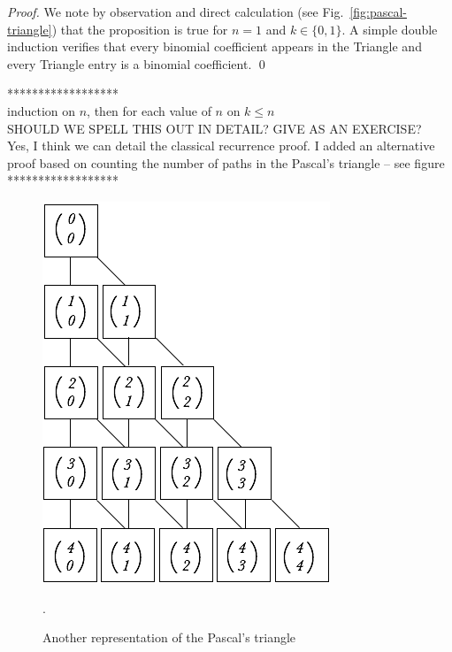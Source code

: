 \begin{proof}
We note by observation and direct calculation (see
Fig.~\ref{fig:pascal-triangle}) that the proposition is true for $n =
1$ and $k \in \{0, 1\}$.  A simple double induction verifies that
every binomial coefficient appears in the Triangle and every Triangle
entry is a binomial coefficient.  \qed
\end{proof}

****************** \\
induction on $n$, then for each value of $n$ on $k \leq n$ \\
{\Arny SHOULD WE SPELL THIS OUT IN DETAIL?  GIVE AS AN EXERCISE?} \\
{\Denis Yes, I think we can detail the classical recurrence proof. I added an alternative proof based on counting the number of paths in the Pascal's triangle -- see figure}
******************

\begin{figure}[htb]
\begin{center}
       \includegraphics[scale=0.4]{FiguresMaths/CoeffBinomiaux1}
\caption{Another representation of the Pascal's triangle}.
\label{fig:binomialCoeff1}
\end{center}
\end{figure}

